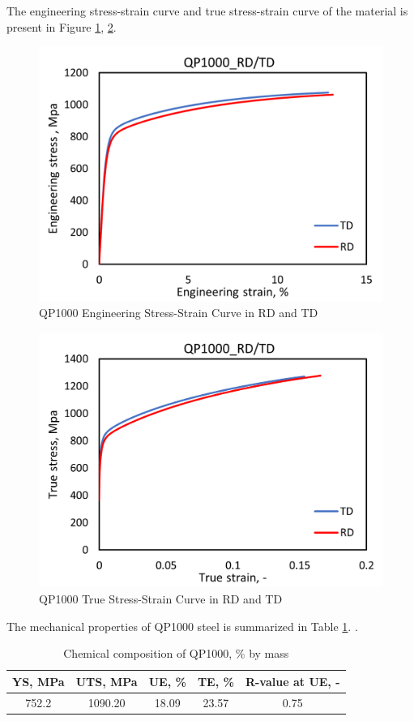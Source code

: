  The engineering stress-strain curve and true stress-strain curve of the material is present in Figure \ref{fig:Estressstrain}, \ref{fig:truess}.
 \begin{figure}
     \centering
     \captionsetup{justification=centering,margin=1cm}
     \includegraphics[width=0.8\linewidth]{Image/EngSSQP1000.png}
     \caption{QP1000 Engineering Stress-Strain Curve in RD and TD}
     \label{fig:Estressstrain}
 \end{figure}
 \begin{figure}
     \centering
     \captionsetup{justification=centering,margin=1cm}
     \includegraphics[width=0.8\linewidth]{Image/TrueSSQP1000.png}
     \caption{QP1000 True Stress-Strain Curve in RD and TD}
     \label{fig:truess}
 \end{figure}
 
 The mechanical properties of QP1000 steel is summarized in Table \ref{mechprop}. \cite{QPprop}.

\begin{table}[h]
    \centering
    \captionsetup{justification=centering,margin=2cm}
    \caption{Chemical composition of QP1000, \% by mass}
    \begin{tabular}{| c | c | c | c | c | }
         \hline
          YS, MPa  &  UTS, MPa  &  UE, \%  &  TE, \%  &  R-value at UE, -  \\
         \hline
        752.2 & 1090.20 & 18.09 & 23.57 & 0.75 \\
         \hline
         
    \end{tabular}
    \label{mechprop}
\end{table}





